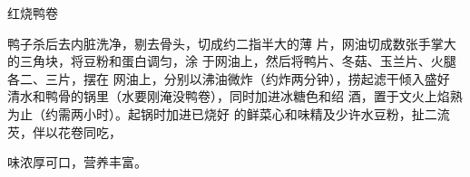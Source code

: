 \begin{recipe}{红烧鸭卷}

\ingredients







\cooking

鸭子杀后去内脏洗净，剔去骨头，切成约二指半大的薄 片，网油切成数张手掌大的三角块，将豆粉和蛋白调匀，涂 于网油上，然后将鸭片、冬菇、玉兰片、火腿各二、三片，摆在 网油上，分别以沸油微炸（约炸两分钟），捞起滤干倾入盛好 清水和鸭骨的锅里（水要刚淹没鸭卷），同时加进冰糖色和绍 酒，置于文火上焰熟为止（约需两小时）。起锅时加进已烧好 的鲜菜心和味精及少许水豆粉，扯二流芡，伴以花卷同吃，

\notes

味浓厚可口，营养丰富。

\end{recipe}

